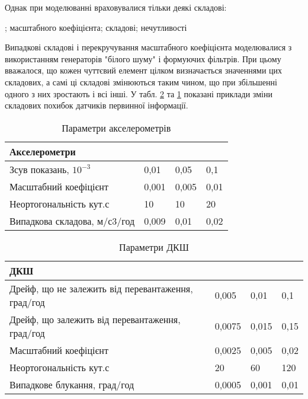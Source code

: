 Однак при моделюванні враховувалися тільки деякі складові:
\begin{enumerate}
  ;
   масштабного коефіцієнта;
   складові;
   нечутливості
\end{enumerate}

Випадкові складові і перекручування масштабного коефіцієнта моделювалися 
з використанням генераторів "білого шуму" і формуючих фільтрів. При цьому 
вважалося, що кожен чуттєвий елемент цілком визначається значеннями цих 
складових, а самі ці складові змінюються таким чином, що при збільшенні 
одного з них зростають і всі інші. У табл. \ref{tab:gyro_err} та \ref{tab:acc_err}  
показані приклади зміни складових  похибок датчиків первинної інформації.

\begin{table}[here]
\centering
\caption{Параметри акселерометрів}

\begin{tabular}{|p{80mm}|p{20mm}|p{20mm}|p{20mm}|} \hline 
\multicolumn{4}{|p{1in}|}{Акселерометри} \\ \hline 
Зсув показань, $10^{-3}$ & 0,01 & 0,05 & 0,1 \\ \hline 
Масштабний коефіцієнт & 0,001 & 0,005 & 0,01 \\ \hline 
Неортогональність кут.с & 10 & 10 & 20 \\ \hline 
Випадкова складова, м/с3/год & 0,009 & 0,01 & 0,02 \\ \hline 

\end{tabular}
\label{tab:acc_err}
\end{table}


\begin{table}[here]
\centering
\caption{Параметри ДКШ}

\begin{tabular}{|p{80mm}|p{20mm}|p{20mm}|p{20mm}|} \hline
\multicolumn{4}{|p{1in}|}{ДКШ} \\ \hline 
Дрейф, що не залежить від перевантаження, град/год & 0,005 & 0,01 & 0,1 \\ \hline 
Дрейф, що залежить від перевантаження, град/год & 0,0075 & 0,015 & 0,15 \\ \hline 
Масштабний коефіцієнт & 0,0025 & 0,005 & 0,02 \\ \hline 
Неортогональність кут.с & 20 & 60 & 120 \\ \hline 
Випадкове блукання, град/год & 0,0005 & 0,001 & 0,01 \\ \hline 
\end{tabular}
\label{tab:gyro_err}
\end{table}
